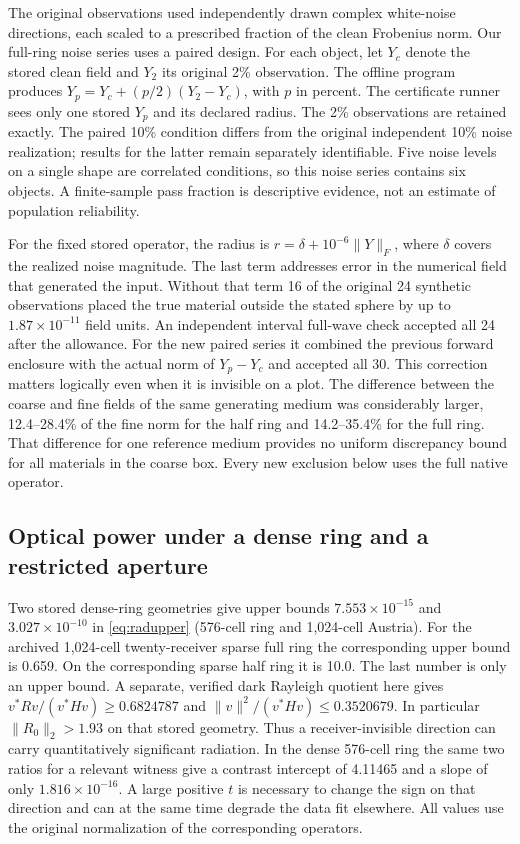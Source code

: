 \documentclass[anonymous,12pt]{iopjournal}
\theoremstyle{remark}\newtheorem{remark}[theorem]{Remark}
\numberwithin{equation}{section}
\begin{document}
The original observations used independently drawn complex white-noise directions, each scaled to a prescribed fraction of the clean Frobenius norm. Our full-ring noise series uses a paired design. For each object, let $Y_c$ denote the stored clean field and $Y_2$ its original 2\% observation. The offline program produces $Y_p=Y_c+(p/2)(Y_2-Y_c)$, with $p$ in percent. The certificate runner sees only one stored $Y_p$ and its declared radius. The 2\% observations are retained exactly. The paired 10\% condition differs from the original independent 10\% noise realization; results for the latter remain separately identifiable. Five noise levels on a single shape are correlated conditions, so this noise series contains six objects. A finite-sample pass fraction is descriptive evidence, not an estimate of population reliability.

For the fixed stored operator, the radius is $r=\delta+10^{-6}\|Y\|_F$, where $\delta$ covers the realized noise magnitude. The last term addresses error in the numerical field that generated the input. Without that term 16 of the original 24 synthetic observations placed the true material outside the stated sphere by up to $1.87\times10^{-11}$ field units. An independent interval full-wave check accepted all 24 after the allowance. For the new paired series it combined the previous forward enclosure with the actual norm of $Y_p-Y_c$ and accepted all 30. This correction matters logically even when it is invisible on a plot. The difference between the coarse and fine fields of the same generating medium was considerably larger, 12.4--28.4\% of the fine norm for the half ring and 14.2--35.4\% for the full ring. That difference for one reference medium provides no uniform discrepancy bound for all materials in the coarse box. Every new exclusion below uses the full native operator.

\subsection{Optical power under a dense ring and a restricted aperture}
Two stored dense-ring geometries give upper bounds $7.553\times10^{-15}$ and $3.027\times10^{-10}$ in \eqref{eq:radupper} (576-cell ring and 1,024-cell Austria). For the archived 1,024-cell twenty-receiver sparse full ring the corresponding upper bound is 0.659. On the corresponding sparse half ring it is 10.0. The last number is only an upper bound. A separate, verified dark Rayleigh quotient here gives $v^*Rv/(v^*Hv)\ge0.6824787$ and $\|v\|^2/(v^*Hv)\le0.3520679$. In particular $\|R_0\|_2>1.93$ on that stored geometry. Thus a receiver-invisible direction can carry quantitatively significant radiation. In the dense 576-cell ring the same two ratios for a relevant witness give a contrast intercept of 4.11465 and a slope of only $1.816\times10^{-16}$. A large positive $t$ is necessary to change the sign on that direction and can at the same time degrade the data fit elsewhere. All values use the original normalization of the corresponding operators.
\end{document}

